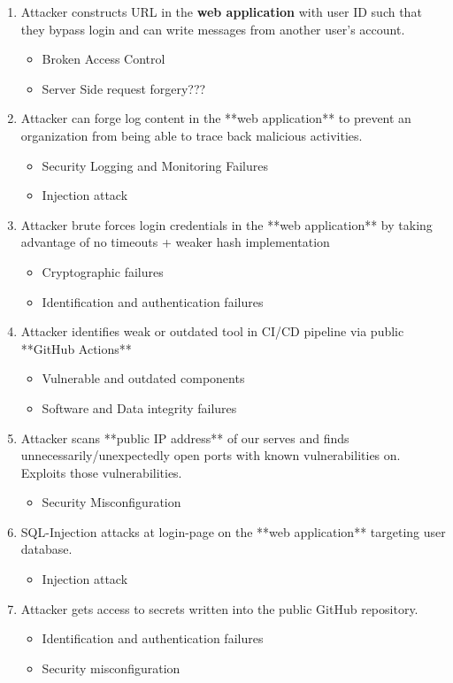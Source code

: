 \begin{enumerate}
    \item Attacker constructs URL in the \textbf{web application} with user ID such that they bypass login and can write messages from another user's account.
        \begin{itemize}
            \item Broken Access Control
            \item Server Side request forgery???
        \end{itemize}
    \item Attacker can forge log content in the **web application** to prevent an organization from being able to trace back malicious activities.
    \begin{itemize}
        \item Security Logging and Monitoring Failures
        \item Injection attack
    \end{itemize}
    \item Attacker brute forces login credentials in the **web application** by taking advantage of no timeouts + weaker hash implementation
    \begin{itemize}
        \item Cryptographic failures
        \item Identification and authentication failures
    \end{itemize}
    \item Attacker identifies weak or outdated tool in CI/CD pipeline via public **GitHub Actions**
    \begin{itemize}
        \item Vulnerable and outdated components
        \item Software and Data integrity failures
    \end{itemize}
    \item Attacker scans **public IP address** of our serves and finds unnecessarily/unexpectedly open ports with known vulnerabilities on. Exploits those vulnerabilities.
    \begin{itemize}
        \item Security Misconfiguration
    \end{itemize}
    \item SQL-Injection attacks at login-page on the **web application** targeting user database.
    \begin{itemize}
        \item Injection attack
    \end{itemize}
    \item Attacker gets access to secrets written into the public GitHub repository.
    \begin{itemize}
        \item Identification and authentication failures
        \item Security misconfiguration
    \end{itemize}
\end{enumerate}

